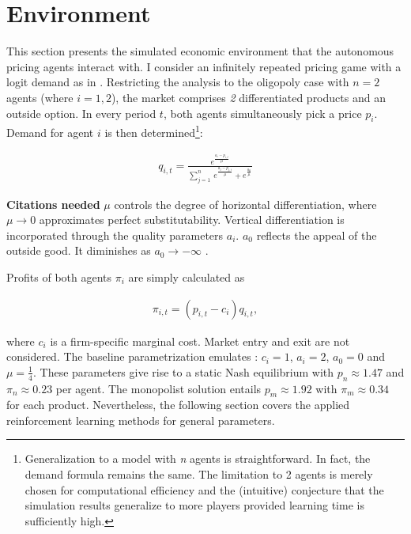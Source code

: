 \section{Environment}\label{enironment}

This section presents the simulated economic environment that the autonomous pricing agents interact with. I consider an infinitely repeated pricing game with a logit demand as in \textcite{calvano_artificial_2019}. Restricting the analysis to the oligopoly case with $n=2$ agents (where $i = 1,2$), the market comprises \emph{2} differentiated products and an outside option. In every period $t$, both agents simultaneously pick a price $p_i$. Demand for agent $i$ is then determined\footnote{Generalization to a model with \emph{n} agents is straightforward. In fact, the demand formula remains the same. The limitation to 2 agents is merely chosen for computational efficiency and the (intuitive) conjecture that the simulation results generalize to more players provided learning time is sufficiently high.}:

\begin{gather}\label{quantity}
q_{i,t}=\frac{e^{\frac{a_i - p_{i,t}}{\mu}}}{\sum_{j=1}^{n}~ e^{\frac{a_j-p_{j,t}}{\mu}}+e^{\frac{a_0}{\mu}}}
\end{gather}

\textbf{Citations needed}
$\mu$ controls the degree of horizontal differentiation, where $\mu \rightarrow 0$ approximates perfect substitutability. Vertical differentiation is incorporated through the quality parameters $a_i$. $a_0$ reflects the appeal of the outside good. It diminishes as $a_0 \rightarrow -\infty$ \parencite{anderson_logit_1992}. 

Profits of both agents $\pi_i$ are simply calculated as

\begin{gather}\label{profit}
\pi_{i,t} = (p_{i,t} - c_i) q_{i,t},
\end{gather}

where $c_i$ is a firm-specific marginal cost. Market entry and exit are not considered. The baseline parametrization emulates \textcite{calvano_artificial_2019}:
$c_i = 1$,
$a_i = 2$,
$a_0 = 0$ and
$\mu = \frac{1}{4}$. These parameters give rise to a static Nash equilibrium with $p_n \approx 1.47$ and $\pi_n \approx 0.23$ per agent. The monopolist solution entails $p_m \approx 1.92$ with $\pi_m \approx 0.34$ for each product. Nevertheless, the following section covers the applied reinforcement learning methods for general parameters.
